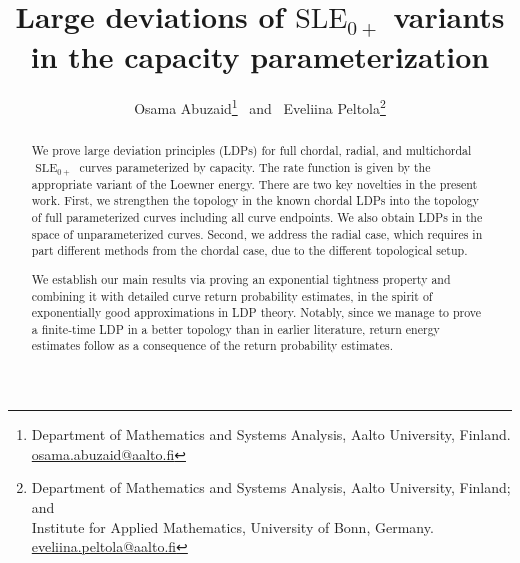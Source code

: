 \documentclass[a4paper, 11pt]{article}
\title{Large deviations of $\mathrm{SLE}_{0+}$ variants \\ in the capacity parameterization}
\date{}
\author{Osama Abuzaid\thanks{Department of Mathematics and Systems Analysis, Aalto University, Finland. \protect\url{osama.abuzaid@aalto.fi}} 
\, and \,
Eveliina Peltola\thanks{Department of Mathematics and Systems Analysis, Aalto University, Finland; and \\ Institute for Applied Mathematics, University of Bonn, Germany.   \protect\url{eveliina.peltola@aalto.fi}}
}
\theoremstyle{definition}
\numberwithin{equation}{section}
\numberwithin{figure}{section}
\newcommand{\SLE}[1][]{\operatorname{SLE}_{#1}}
\begin{document}
\maketitle



\begin{abstract}
We prove large deviation principles (LDPs) for full chordal, radial, and multichordal $\SLE[0+]$ curves parameterized by capacity. The rate function is given by the appropriate variant of the Loewner energy. There are two key novelties in the present work. First, we strengthen the topology in the known chordal LDPs into the topology of full parameterized curves including all curve endpoints. We also obtain LDPs in the space of unparameterized curves. Second, we address the radial case, which requires in part different methods from the chordal case, due to the different topological setup. 

We establish our main results via proving an exponential tightness property and combining it with detailed curve return probability estimates, in the spirit of exponentially good approximations in LDP theory. Notably, since we manage to prove a finite-time LDP in a better topology than in earlier literature, return energy estimates follow as a consequence of the return probability estimates. 
\end{abstract}



\newpage

\tableofcontents


\newpage
\end{document}
